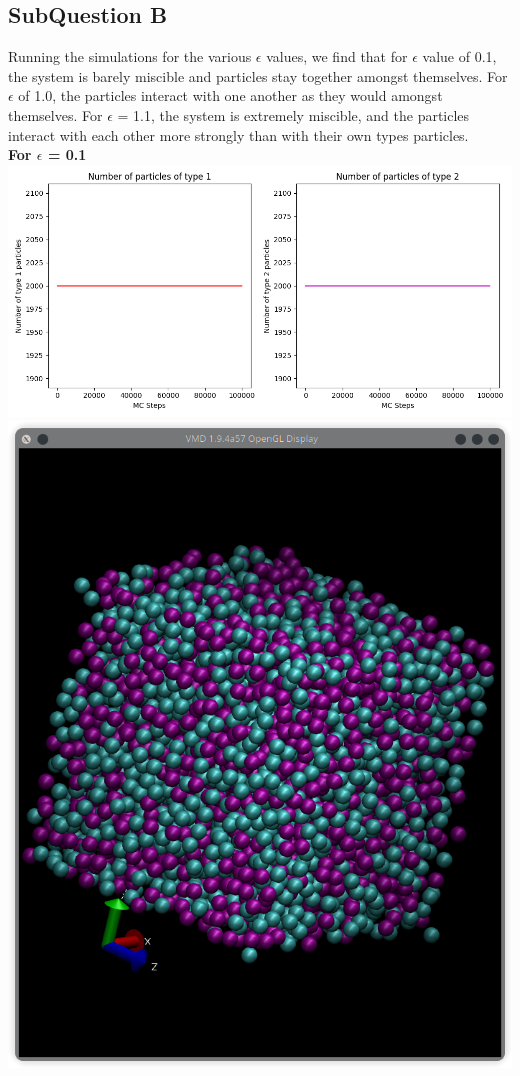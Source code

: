 \documentclass[11pt]{article}
\begin{document}
\subsection{SubQuestion B}
Running the simulations for the various $\epsilon$ values, we find that for $\epsilon$ value of 0.1, the system is barely miscible and particles stay together amongst themselves. For $\epsilon$ of 1.0, the particles interact with one another as they would amongst themselves. For $\epsilon$ = 1.1, the system is extremely miscible, and the particles interact with each other more strongly than with their own types particles.\\
\textbf{For $\epsilon$ = 0.1} \\
\includegraphics[scale=0.5]{Q2b_01ePlot.png} \\
\includegraphics[scale=0.5]{Q2b_01eLF.png}\\
\end{document}
